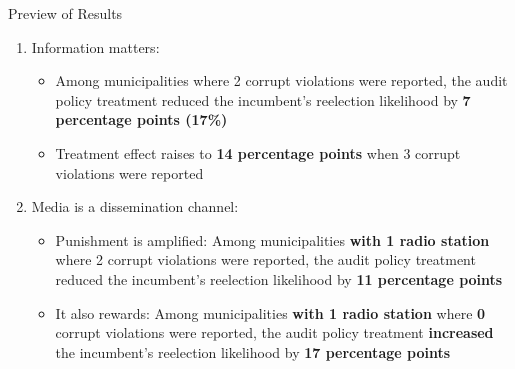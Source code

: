 \begin{frame}{Preview of Results}
    \begin{enumerate}
        \item<1-> Information matters:
        \begin{itemize}
            \item<2-> Among municipalities where 2 corrupt violations were reported, the audit policy treatment reduced the incumbent's reelection likelihood by \textbf{\color{orange}7 percentage points (17\%)}
            \item<3-> Treatment effect raises to \textbf{\color{orange}14 percentage points} when 3 corrupt violations were reported 
        \end{itemize}
        \item<4-> Media is a dissemination channel: 
        \begin{itemize}
            \item<5-> Punishment is amplified: Among municipalities \textbf{\color{orange}with 1 radio station} where 2 corrupt violations were reported, the audit policy treatment reduced the incumbent's reelection likelihood by \textbf{\color{orange}11 percentage points}
            \item<6-> It also rewards:  Among municipalities \textbf{\color{orange}with 1 radio station} where \textbf{\color{orange}0} corrupt violations were reported,  the audit policy treatment \textbf{\color{orange}increased} the incumbent's reelection likelihood by \textbf{\color{orange}17 percentage points}
        \end{itemize}
 
    \end{enumerate}
\end{frame}

